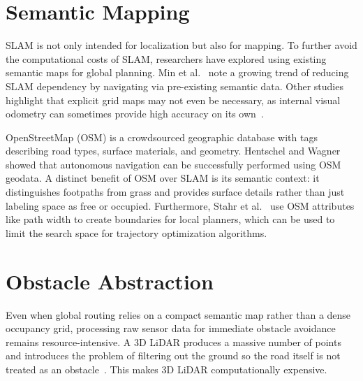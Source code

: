 \section{Semantic Mapping}
\label{sec:rw-semantic-mapping}

SLAM is not only intended for localization but also for mapping. To further avoid the computational costs of SLAM, researchers have explored using existing semantic maps for global planning. Min et al.~\cite{min2026offroad} note a growing trend of reducing SLAM dependency by navigating via pre-existing semantic data. Other studies highlight that explicit grid maps may not even be necessary, as internal visual odometry can sometimes provide high accuracy on its own~\cite{partsey2022mapping}.

OpenStreetMap (OSM) is a crowdsourced geographic database with tags describing road types, surface materials, and geometry. Hentschel and Wagner~\cite{hentschel2010osm} showed that autonomous navigation can be successfully performed using OSM geodata. A distinct benefit of OSM over SLAM is its semantic context: it distinguishes footpaths from grass and provides surface details rather than just labeling space as free or occupied. Furthermore, Stahr et al.~\cite{stahr2023osm} use OSM attributes like path width to create boundaries for local planners, which can be used to limit the search space for trajectory optimization algorithms.

\section{Obstacle Abstraction}
\label{sec:rw-obstacle-abstraction}

Even when global routing relies on a compact semantic map rather than a dense occupancy grid, processing raw sensor data for immediate obstacle avoidance remains resource-intensive. 
A 3D LiDAR produces a massive number of points and introduces the problem of filtering out the ground so the road itself is not treated as an obstacle~\cite{cellina2025lidar}. This makes 3D LiDAR computationally expensive.

